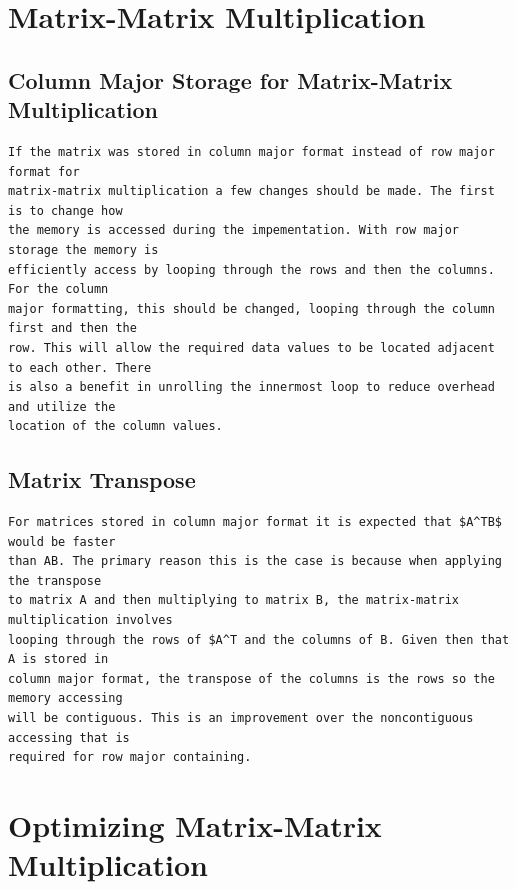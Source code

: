 \documentclass{article}
\begin{document}
\section{Matrix-Matrix Multiplication}

\subsection{Column Major Storage for Matrix-Matrix Multiplication}
\begin{verbatim}
If the matrix was stored in column major format instead of row major format for
matrix-matrix multiplication a few changes should be made. The first is to change how
the memory is accessed during the impementation. With row major storage the memory is 
efficiently access by looping through the rows and then the columns. For the column 
major formatting, this should be changed, looping through the column first and then the
row. This will allow the required data values to be located adjacent to each other. There
is also a benefit in unrolling the innermost loop to reduce overhead and utilize the
location of the column values.
\end{verbatim}

\subsection{Matrix Transpose}
\begin{lstlisting}[mathescape=true]
For matrices stored in column major format it is expected that $A^TB$ would be faster 
than AB. The primary reason this is the case is because when applying the transpose 
to matrix A and then multiplying to matrix B, the matrix-matrix multiplication involves 
looping through the rows of $A^T and the columns of B. Given then that A is stored in 
column major format, the transpose of the columns is the rows so the memory accessing 
will be contiguous. This is an improvement over the noncontiguous accessing that is 
required for row major containing. 
\end{lstlisting}



\section{Optimizing Matrix-Matrix Multiplication}
\end{document}
